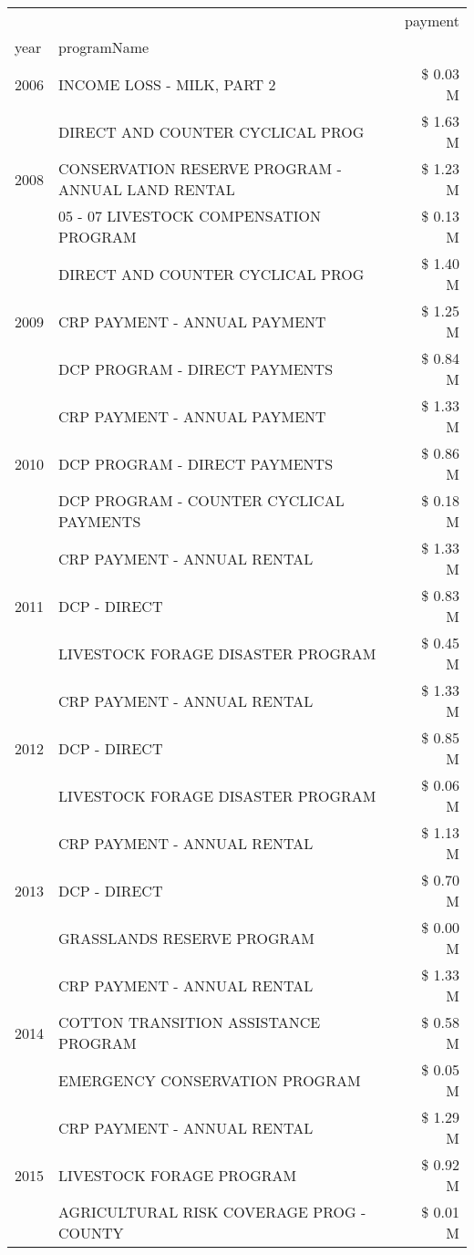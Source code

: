 \begin{tabular}{llr}
\toprule
 &  & payment \\
year & programName &  \\
\midrule
2006 & INCOME LOSS - MILK, PART 2 & \$ 0.03 M \\
\cline{1-3}
\multirow[t]{3}{*}{2008} & DIRECT AND COUNTER CYCLICAL PROG & \$ 1.63 M \\
 & CONSERVATION RESERVE PROGRAM - ANNUAL LAND RENTAL & \$ 1.23 M \\
 & 05 - 07 LIVESTOCK COMPENSATION PROGRAM & \$ 0.13 M \\
\cline{1-3}
\multirow[t]{3}{*}{2009} & DIRECT AND COUNTER CYCLICAL PROG & \$ 1.40 M \\
 & CRP PAYMENT - ANNUAL PAYMENT & \$ 1.25 M \\
 & DCP PROGRAM - DIRECT PAYMENTS & \$ 0.84 M \\
\cline{1-3}
\multirow[t]{3}{*}{2010} & CRP PAYMENT - ANNUAL PAYMENT & \$ 1.33 M \\
 & DCP PROGRAM - DIRECT PAYMENTS & \$ 0.86 M \\
 & DCP PROGRAM - COUNTER CYCLICAL PAYMENTS & \$ 0.18 M \\
\cline{1-3}
\multirow[t]{3}{*}{2011} & CRP PAYMENT - ANNUAL RENTAL & \$ 1.33 M \\
 & DCP - DIRECT & \$ 0.83 M \\
 & LIVESTOCK FORAGE DISASTER PROGRAM & \$ 0.45 M \\
\cline{1-3}
\multirow[t]{3}{*}{2012} & CRP PAYMENT - ANNUAL RENTAL & \$ 1.33 M \\
 & DCP - DIRECT & \$ 0.85 M \\
 & LIVESTOCK FORAGE DISASTER PROGRAM & \$ 0.06 M \\
\cline{1-3}
\multirow[t]{3}{*}{2013} & CRP PAYMENT - ANNUAL RENTAL & \$ 1.13 M \\
 & DCP - DIRECT & \$ 0.70 M \\
 & GRASSLANDS RESERVE PROGRAM & \$ 0.00 M \\
\cline{1-3}
\multirow[t]{3}{*}{2014} & CRP PAYMENT - ANNUAL RENTAL & \$ 1.33 M \\
 & COTTON TRANSITION ASSISTANCE PROGRAM & \$ 0.58 M \\
 & EMERGENCY CONSERVATION PROGRAM & \$ 0.05 M \\
\cline{1-3}
\multirow[t]{3}{*}{2015} & CRP PAYMENT - ANNUAL RENTAL & \$ 1.29 M \\
 & LIVESTOCK FORAGE PROGRAM & \$ 0.92 M \\
 & AGRICULTURAL RISK COVERAGE PROG - COUNTY & \$ 0.01 M \\

\end{tabular}
